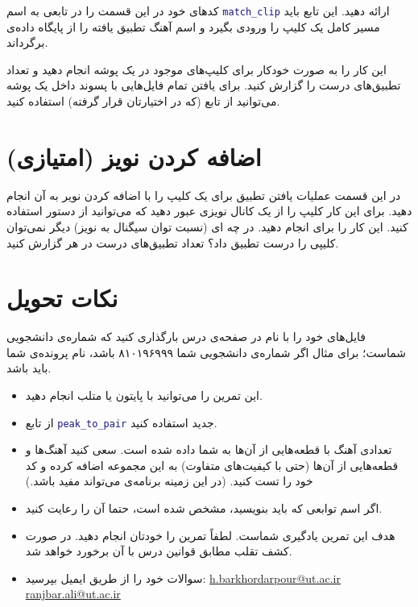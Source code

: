 \documentclass{utsignal}
\begin{document}
	کد‌های خود در این قسمت را در تابعی به اسم \lstinline[language=Matlab]{match_clip} ارائه دهید. این تابع باید مسیر کامل یک کلیپ را ورودی بگیرد و اسم آهنگ تطبیق یافته را از پایگاه داده‌ی  برگرداند.
	
	این کار را به صورت خودکار برای کلیپ‌های موجود در یک پوشه انجام دهید و تعداد تطبیق‌های درست را گزارش کنید. برای یافتن تمام فایل‌هایی با پسوند  داخل یک پوشه می‌توانید از تابع  (که در اختیارتان قرار گرفته) استفاده کنید.
	
	\section{اضافه کردن نویز (امتیازی)}
	در این قسمت عملیات یافتن تطبیق برای یک کلیپ را با اضافه کردن نویر به آن انجام دهید. برای این کار کلیپ را از یک کانال نویزی عبور دهید که می‌توانید از دستور  استفاده کنید. این کار را برای  انجام دهید. در چه ای (نسبت توان سیگنال به نویز) دیگر نمی‌توان کلیپی را درست تطبیق داد؟ تعداد تطبیق‌های درست در هر  گزارش کنید.
	
	\section*{نکات تحویل}
	فایل‌های خود را با نام  در صفحه‌ی  درس بارگذاری کنید که  شماره‌ی دانشجویی شماست؛ برای مثال اگر شماره‌ی دانشجویی شما ۸۱۰۱۹۶۹۹۹ باشد، نام پرونده‌ی شما باید  باشد.
	\begin{itemize}
		\item این تمرین را می‌توانید با پایتون یا متلب انجام دهید.
		\item از تابع \lstinline[language=Matlab]{peak_to_pair} جدید استفاده کنید.
		\item تعدادی آهنگ با قطعه‌هایی از آن‌ها به شما داده شده است. سعی کنید آهنگ‌ها و قطعه‌هایی از آن‌ها (حتی با کیفیت‌های متفاوت) به این مجموعه اضافه کرده و کد خود را تست کنید. (در این زمینه برنامه‌ی  می‌تواند مفید باشد.)
		\item اگر اسم توابعی که باید بنویسید، مشخص شده است، حتما آن را رعایت کنید.
		\item هدف این تمرین یادگیری شماست. لطفاً تمرین را خودتان انجام دهید. در صورت کشف تقلب مطابق قوانین درس با آن برخورد خواهد شد.
		\item سوالات خود را از طریق ایمیل بپرسید:
		\subitem \href{mailto:h.barkhordarpour@ut.ac.ir?subject=[SS\%20S98 P1]}{h.barkhordarpour@ut.ac.ir}
		\subitem \href{mailto:ranjbar.ali@ut.ac.ir?subject=[SS\%20S98 P1]}{ranjbar.ali@ut.ac.ir}
	\end{itemize}
\end{document}
